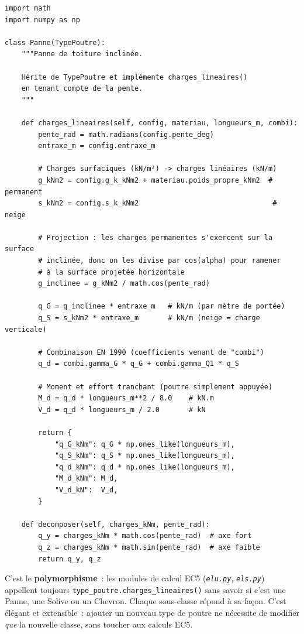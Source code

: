 \documentclass[12pt, a4paper, openany]{book}
\newcommand{\py}[1]{\texttt{#1}}
\newcommand{\fichier}[1]{\texttt{\textit{#1}}}
\begin{document}
\begin{lstlisting}[style=python, caption={Classe \py{Panne} --- implémentation pour toiture inclinée (simplifié)}]
import math
import numpy as np

class Panne(TypePoutre):
    """Panne de toiture inclinée.

    Hérite de TypePoutre et implémente charges_lineaires()
    en tenant compte de la pente.
    """

    def charges_lineaires(self, config, materiau, longueurs_m, combi):
        pente_rad = math.radians(config.pente_deg)
        entraxe_m = config.entraxe_m

        # Charges surfaciques (kN/m²) -> charges linéaires (kN/m)
        g_kNm2 = config.g_k_kNm2 + materiau.poids_propre_kNm2  # permanent
        s_kNm2 = config.s_k_kNm2                                # neige

        # Projection : les charges permanentes s'exercent sur la surface
        # inclinée, donc on les divise par cos(alpha) pour ramener
        # à la surface projetée horizontale
        g_inclinee = g_kNm2 / math.cos(pente_rad)

        q_G = g_inclinee * entraxe_m   # kN/m (par mètre de portée)
        q_S = s_kNm2 * entraxe_m       # kN/m (neige = charge verticale)

        # Combinaison EN 1990 (coefficients venant de "combi")
        q_d = combi.gamma_G * q_G + combi.gamma_Q1 * q_S

        # Moment et effort tranchant (poutre simplement appuyée)
        M_d = q_d * longueurs_m**2 / 8.0    # kN.m
        V_d = q_d * longueurs_m / 2.0       # kN

        return {
            "q_G_kNm": q_G * np.ones_like(longueurs_m),
            "q_S_kNm": q_S * np.ones_like(longueurs_m),
            "q_d_kNm": q_d * np.ones_like(longueurs_m),
            "M_d_kNm": M_d,
            "V_d_kN":  V_d,
        }

    def decomposer(self, charges_kNm, pente_rad):
        q_y = charges_kNm * math.cos(pente_rad)  # axe fort
        q_z = charges_kNm * math.sin(pente_rad)  # axe faible
        return q_y, q_z
\end{lstlisting}

\begin{important}
C'est le \textbf{polymorphisme}~: les modules de calcul EC5
(\fichier{elu.py}, \fichier{els.py}) appellent toujours
\py{type\_poutre.charges\_lineaires()} sans savoir si c'est une Panne,
une Solive ou un Chevron. Chaque sous-classe r\'epond \`a sa fa\c{c}on.
C'est \'el\'egant et extensible~: ajouter un nouveau type de poutre
ne n\'ecessite de modifier \emph{que} la nouvelle classe, sans toucher
aux calculs EC5.
\end{important}
\end{document}
